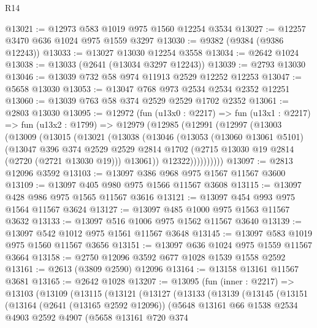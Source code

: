 \begin{lexlean}{R14}
\begin{coremodule}
@13021 := @12973 @583 @1019 @975 @1560 @12254 @3534
@13027 := @12257 @3470 @636 @1024 @975 @1559 @3297
@13030 := @9382 (@9384 (@9386 @12243))
@13033 := @13027 @13030 @12254 @3558
@13034 := @2642 @1024
@13038 := @13033 (@2641 (@13034 @3297 @12243))
@13039 := @2793 @13030
@13046 := @13039 @732 @58 @974 @11913 @2529 @12252 @12253
@13047 := @5658 @13030
@13053 := @13047 @768 @973 @2534 @2534 @2352 @12251
@13060 := @13039 @763 @58 @374 @2529 @2529 @1702 @2352
@13061 := @2803 @13030
@13095 := @12972
    (fun (u13x0 : @2217) =>
    fun (u13x1 : @2217) =>
    fun (u13x2 : @1799) =>
    @12979
      (@12985
        (@12991
          (@12997
            (@13003
              (@13009
                (@13015
                  (@13021
                    (@13038
                      (@13046
                        (@13053
                          (@13060 @13061 @5101)
                          (@13047
                            @396
                            @374
                            @2529
                            @2529
                            @2814
                            @1702
                            (@2715 @13030 @19 @2814 (@2720 (@2721 @13030 @19)))
                            @13061))
                        @12322))))))))))
@13097 := @2813 @12096 @3592
@13103 := @13097 @386 @968 @975 @1567 @11567 @3600
@13109 := @13097 @405 @980 @975 @1566 @11567 @3608
@13115 := @13097 @428 @986 @975 @1565 @11567 @3616
@13121 := @13097 @454 @993 @975 @1564 @11567 @3624
@13127 := @13097 @485 @1000 @975 @1563 @11567 @3632
@13133 := @13097 @516 @1006 @975 @1562 @11567 @3640
@13139 := @13097 @542 @1012 @975 @1561 @11567 @3648
@13145 := @13097 @583 @1019 @975 @1560 @11567 @3656
@13151 := @13097 @636 @1024 @975 @1559 @11567 @3664
@13158 := @2750 @12096 @3592 @677 @1028 @1539 @1558 @2592
@13161 := @2613 (@3809 @2590) @12096
@13164 := @13158 @13161 @11567 @3681
@13165 := @2642 @1028
@13207 := @13095
    (fun (inner : @2217) =>
    @13103
      (@13109
        (@13115
          (@13121
            (@13127
              (@13133
                (@13139
                  (@13145
                    (@13151
                      (@13164
                        (@2641 (@13165 @2592 @12096))
                        (@5648
                          @13161
                          @66
                          @1538
                          @2534
                          @4903
                          @2592
                          @4907
                          (@5658
                            @13161
                            @720
                            @374

\end{coremodule}
\end{lexlean}
